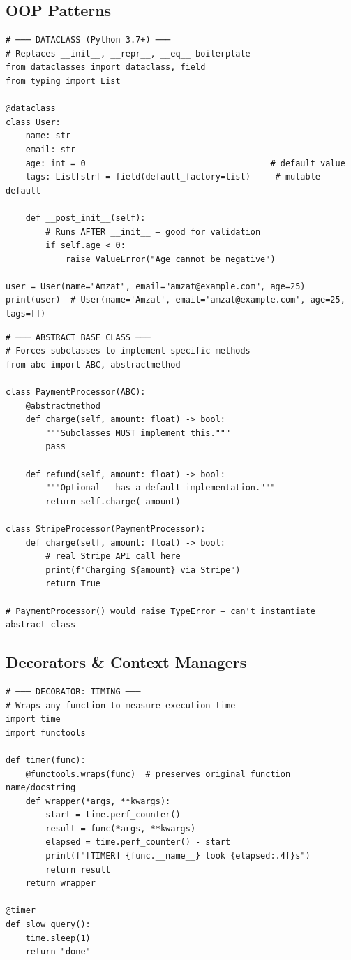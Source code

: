 \documentclass[10pt, a4paper]{article}
\begin{document}
\subsection{OOP Patterns}


\begin{lstlisting}[language=mypython]
# ─── DATACLASS (Python 3.7+) ───
# Replaces __init__, __repr__, __eq__ boilerplate
from dataclasses import dataclass, field
from typing import List

@dataclass
class User:
    name: str
    email: str
    age: int = 0                                     # default value
    tags: List[str] = field(default_factory=list)     # mutable default
    
    def __post_init__(self):
        # Runs AFTER __init__ — good for validation
        if self.age < 0:
            raise ValueError("Age cannot be negative")

user = User(name="Amzat", email="amzat@example.com", age=25)
print(user)  # User(name='Amzat', email='amzat@example.com', age=25, tags=[])
\end{lstlisting}


\begin{lstlisting}[language=mypython]
# ─── ABSTRACT BASE CLASS ───
# Forces subclasses to implement specific methods
from abc import ABC, abstractmethod

class PaymentProcessor(ABC):
    @abstractmethod
    def charge(self, amount: float) -> bool:
        """Subclasses MUST implement this."""
        pass
    
    def refund(self, amount: float) -> bool:
        """Optional — has a default implementation."""
        return self.charge(-amount)

class StripeProcessor(PaymentProcessor):
    def charge(self, amount: float) -> bool:
        # real Stripe API call here
        print(f"Charging ${amount} via Stripe")
        return True

# PaymentProcessor() would raise TypeError — can't instantiate abstract class
\end{lstlisting}


\subsection{Decorators \& Context Managers}


\begin{lstlisting}[language=mypython]
# ─── DECORATOR: TIMING ───
# Wraps any function to measure execution time
import time
import functools

def timer(func):
    @functools.wraps(func)  # preserves original function name/docstring
    def wrapper(*args, **kwargs):
        start = time.perf_counter()
        result = func(*args, **kwargs)
        elapsed = time.perf_counter() - start
        print(f"[TIMER] {func.__name__} took {elapsed:.4f}s")
        return result
    return wrapper

@timer
def slow_query():
    time.sleep(1)
    return "done"
\end{lstlisting}
\end{document}
